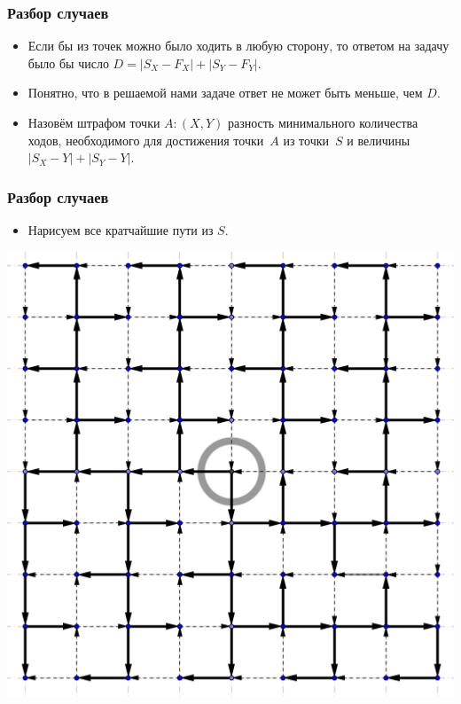 \begin{frame}
    \frametitle{Разбор случаев}

    \begin{itemize}
        \item Если бы из точек можно было ходить в любую сторону, то ответом на задачу было бы число $D = |S_X-F_X| + |S_Y-F_Y|$.
        \item Понятно, что в решаемой нами задаче ответ не может быть меньше, чем $D$.
        \item Назовём штрафом точки $A: (X, Y)$ разность минимального количества ходов, необходимого для достижения точки~$A$ из точки~$S$ и величины $|S_X-Y| + |S_Y-Y|$.
    \end{itemize}
\end{frame}

\begin{frame}
    \frametitle{Разбор случаев}

    \begin{itemize}
        \item Нарисуем все кратчайшие пути из $S$.
    \end{itemize}
    \includegraphics[scale=0.6]{manhattan/pics/even_even.png}
\end{frame}

